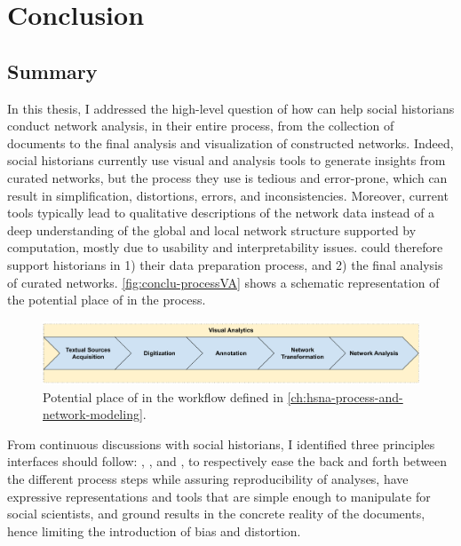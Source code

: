 \chapter{Conclusion}\label{ch:conclusion}
\minitoc

\section{Summary}

In this thesis, I addressed the high-level question of how \va can help social historians conduct network analysis, in their entire process, from the collection of documents to the final analysis and visualization of constructed networks.
Indeed, social historians currently use visual and analysis tools to generate insights from curated networks, but the process they use is tedious and error-prone, which can result in simplification, distortions, errors, and inconsistencies\cite{alkadi2022, lemercier12FormalNetwork2015}.
Moreover, current tools typically lead to qualitative descriptions of the network data\cite{rollingerProlegomenaProblemsPerspectives2020} instead of a deep understanding of the global and local network structure supported by computation, mostly due to usability and interpretability issues.
\va could therefore support historians in 1) their data preparation process, and 2) the final analysis of curated networks.
\autoref{fig:conclu-processVA} shows a schematic representation of the potential place of \va in the \hsna process.
\begin{figure}[!ht]
    \centering
    \includegraphics[width=\textwidth]{static/figures/conclusion/workflowVA}
    \caption{Potential place of \va in the \hsna workflow defined in \autoref{ch:hsna-process-and-network-modeling}.}
\label{fig:conclu-processVA}
\end{figure}
From continuous discussions with social historians, I identified three principles \va interfaces should follow: \traceability, \simplicity, and \reality, to respectively ease the back and forth between the different process steps while assuring reproducibility of analyses, have expressive representations and tools that are simple enough to manipulate for social scientists, and ground results in the concrete reality of the documents, hence limiting the introduction of bias and distortion.

